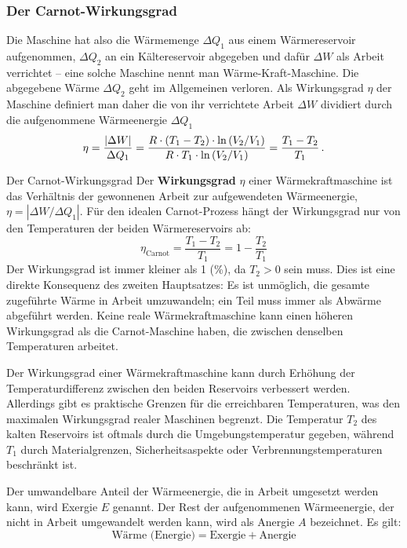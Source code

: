 \subsubsection{Der Carnot-Wirkungsgrad}
Die Maschine hat also die Wärmemenge $\Delta Q_1$ aus einem Wärmereservoir aufgenommen, $\Delta Q_2$ an ein Kältereservoir abgegeben und dafür $\Delta W$ als Arbeit verrichtet -- eine solche Maschine nennt man Wärme-Kraft-Maschine. Die abgegebene Wärme $\Delta Q_2$ geht im Allgemeinen verloren. Als Wirkungsgrad $\eta$ der Maschine definiert man daher die von ihr verrichtete Arbeit $\Delta W$ dividiert durch die aufgenommene Wärmeenergie $\Delta Q_1$
\begin{equation}
    \eta = \frac{|\Delta W|}{\Delta Q_1} = \frac{R\cdot (T_1-T_2) \cdot \ln\left( V_2/V_1 \right) }{R\cdot T_1 \cdot \ln\left( V_2/V_1 \right)} = \frac{T_1 - T_2}{T_1} \,.
\end{equation}

\begin{importantbox}{Der Carnot-Wirkungsgrad}
    Der \textbf{Wirkungsgrad} $\eta$ einer Wärmekraftmaschine ist das Verhältnis der gewonnenen Arbeit zur aufgewendeten Wärmeenergie, $\eta = |\Delta W / \Delta Q_1|$. Für den idealen Carnot-Prozess hängt der Wirkungsgrad nur von den Temperaturen der beiden Wärmereservoirs ab:
    \begin{equation}\label{eq: carnot_wirkungsgrad}
        \eta_{\text{Carnot}} = \frac{T_1 - T_2}{T_1} = 1 - \frac{T_2}{T_1}
    \end{equation}
    Der Wirkungsgrad ist immer kleiner als 1 (\%), da $T_2 > 0$ sein muss. Dies ist eine direkte Konsequenz des zweiten Hauptsatzes: Es ist unmöglich, die gesamte zugeführte Wärme in Arbeit umzuwandeln; ein Teil muss immer als Abwärme abgeführt werden. Keine reale Wärmekraftmaschine kann einen höheren Wirkungsgrad als die Carnot-Maschine haben, die zwischen denselben Temperaturen arbeitet.
\end{importantbox}
Der Wirkungsgrad einer Wärmekraftmaschine kann durch Erhöhung der Temperaturdifferenz zwischen den beiden Reservoirs verbessert werden. Allerdings gibt es praktische Grenzen für die erreichbaren Temperaturen, was den maximalen Wirkungsgrad realer Maschinen begrenzt. Die Temperatur $T_2$ des kalten Reservoirs ist oftmals durch die Umgebungstemperatur gegeben, während $T_1$ durch Materialgrenzen, Sicherheitsaspekte oder Verbrennungstemperaturen beschränkt ist.

Der umwandelbare Anteil der Wärmeenergie, die in Arbeit umgesetzt werden kann, wird Exergie $E$ genannt. Der Rest der aufgenommenen Wärmeenergie, der nicht in Arbeit umgewandelt werden kann, wird als Anergie $A$ bezeichnet. Es gilt:
\begin{equation}
    \text{Wärme (Energie)} = \text{Exergie} + \text{Anergie} 
\end{equation}

